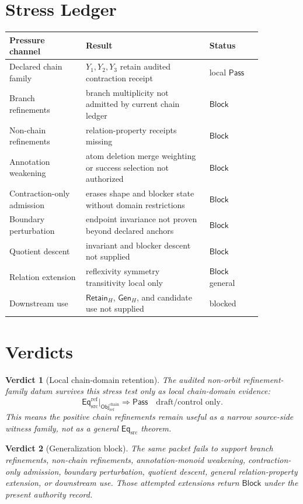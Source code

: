 \documentclass[11pt]{article}
\newcommand{\EqSrc}{\mathsf{Eq}_{\mathrm{src}}}
\newcommand{\EqRef}{\mathsf{Eq}_{\mathrm{src}}^{\mathrm{ref}}}
\newcommand{\ObjRef}{\mathsf{Obj}_{\mathrm{ref}}}
\newcommand{\RetainH}{\mathsf{Retain}_{H}}
\newcommand{\GenH}{\mathsf{Gen}_{H}}
\newcommand{\Pass}{\mathsf{Pass}}
\newcommand{\Block}{\mathsf{Block}}
\newtheorem{verdict}{Verdict}
\begin{document}
\section{Stress Ledger}

\begin{center}
\begin{tabular}{p{0.26\linewidth}p{0.42\linewidth}p{0.18\linewidth}}
\textbf{Pressure channel} & \textbf{Result} & \textbf{Status} \\
\hline
Declared chain family & \(Y_{1},Y_{2},Y_{3}\) retain audited contraction receipt & local \(\Pass\) \\
Branch refinements & branch multiplicity not admitted by current chain ledger & \(\Block\) \\
Non-chain refinements & relation-property receipts missing & \(\Block\) \\
Annotation weakening & atom deletion merge weighting or success selection not authorized & \(\Block\) \\
Contraction-only admission & erases shape and blocker state without domain restrictions & \(\Block\) \\
Boundary perturbation & endpoint invariance not proven beyond declared anchors & \(\Block\) \\
Quotient descent & invariant and blocker descent not supplied & \(\Block\) \\
Relation extension & reflexivity symmetry transitivity local only & \(\Block\) general \\
Downstream use & \(\RetainH\), \(\GenH\), and candidate use not supplied & blocked \\
\end{tabular}
\end{center}

\section{Verdicts}

\begin{verdict}[Local chain-domain retention]
The audited non-orbit refinement-family datum survives this stress test
only as local chain-domain evidence:
\[
    \EqRef\big|_{\ObjRef^{\mathrm{chain}}} \Rightarrow \Pass
    \quad\text{draft/control only.}
\]
This means the positive chain refinements remain useful as a narrow
source-side witness family, not as a general \(\EqSrc\) theorem.
\end{verdict}

\begin{verdict}[Generalization block]
The same packet fails to support branch refinements, non-chain
refinements, annotation-monoid weakening, contraction-only admission,
boundary perturbation, quotient descent, general relation-property
extension, or downstream use. Those attempted extensions return
\(\Block\) under the present authority record.
\end{verdict}
\end{document}
